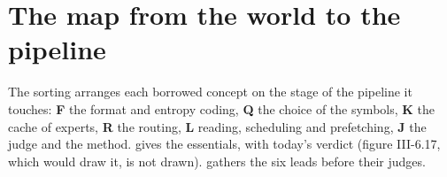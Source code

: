\section{The map from the world to the pipeline}\label{t3mim:sec:carte}

The sorting arranges each borrowed concept on the stage of the pipeline it touches: \textbf{F} the format and entropy coding, \textbf{Q} the choice of the symbols, \textbf{K} the cache of experts, \textbf{R} the routing, \textbf{L} reading, scheduling and prefetching, \textbf{J} the judge and the method.  gives the essentials, with today's verdict (figure III-6.17, which would draw it, is not drawn).  gathers the six leads before their judges.

